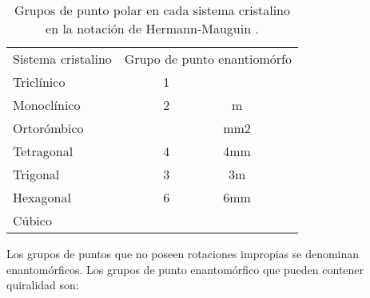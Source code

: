 \begin{table}[H]
\centering
\begin{tabular}{lrc}
\hline
\multicolumn{1}{c}{\multirow{2}{*}{Sistema cristalino}} & \multicolumn{2}{c}{\multirow{2}{*}{Grupo de punto enantiomórfo}} \\
\multicolumn{1}{c}{}                                    & \multicolumn{2}{c}{}                                             \\ \hline
Triclínico                                              & 1                                       &                        \\
Monoclínico                                             & 2                                       & m                      \\
Ortorómbico                                             &                                         & mm2                    \\
Tetragonal                                              & 4                                       & 4mm                    \\
Trigonal                                                & 3                                       & 3m                     \\
Hexagonal                                               & 6                                       & 6mm                    \\
Cúbico                                                  & \multicolumn{1}{c}{}                    &                        \\ \hline
\end{tabular}
\caption{Grupos de punto polar en cada sistema cristalino en la notación de Hermann-Mauguin \cite{Hermann2015notation}.}
\label{Tab. polar}
\end{table}

Los grupos de puntos que no poseen rotaciones impropias se denominan enantomórficos. Los grupos de punto enantomórfico que pueden contener quiralidad son: 


